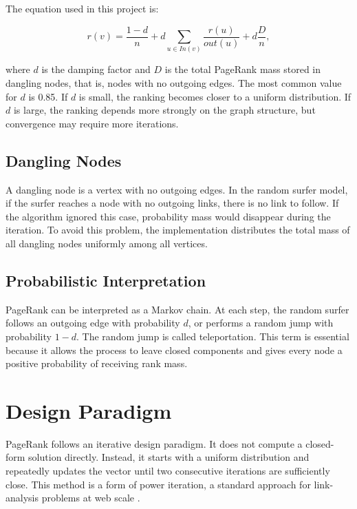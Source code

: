 \documentclass[runningheads]{llncs}
\begin{document}
The equation used in this project is:

\begin{equation}
r(v)=\frac{1-d}{n}+d\sum_{u\in In(v)}\frac{r(u)}{out(u)}+d\frac{D}{n},
\end{equation}

where \(d\) is the damping factor and \(D\) is the total PageRank mass stored in dangling nodes, that is, nodes with no outgoing edges. The most common value for \(d\) is 0.85. If \(d\) is small, the ranking becomes closer to a uniform distribution. If \(d\) is large, the ranking depends more strongly on the graph structure, but convergence may require more iterations.

\subsection{Dangling Nodes}

A dangling node is a vertex with no outgoing edges. In the random surfer model, if the surfer reaches a node with no outgoing links, there is no link to follow. If the algorithm ignored this case, probability mass would disappear during the iteration. To avoid this problem, the implementation distributes the total mass of all dangling nodes uniformly among all vertices.

\subsection{Probabilistic Interpretation}

PageRank can be interpreted as a Markov chain. At each step, the random surfer follows an outgoing edge with probability \(d\), or performs a random jump with probability \(1-d\). The random jump is called teleportation. This term is essential because it allows the process to leave closed components and gives every node a positive probability of receiving rank mass.

\section{Design Paradigm}

PageRank follows an iterative design paradigm. It does not compute a closed-form solution directly. Instead, it starts with a uniform distribution and repeatedly updates the vector until two consecutive iterations are sufficiently close. This method is a form of power iteration, a standard approach for link-analysis problems at web scale \cite{leskovec2020mmds}.
\end{document}
